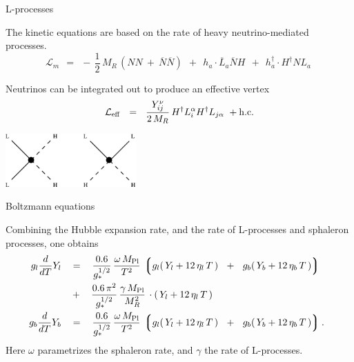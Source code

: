 \documentclass[pdf,UofT06talk,slideColor,colorBG,accumulate]{prosper}
\newcommand{\ov}{\overline}
\newcommand{\lgr}{\left\lgroup}
\newcommand{\rgr}{\right\rgroup}
\newcommand{\Mpl}{M_{\rm Pl}}
\begin{document}
\begin{slide}{L-processes}

	The kinetic equations are based on the rate of heavy
	neutrino-mediated processes.
\[
	\mathcal{L}_m  ~~=~~ 
	-\,\frac 12\, M_R\, \left( NN ~+~ \ov{N}\ov{N} \right) ~~+~~
				h_a\cdot \ov{L}_a\ov{ N}H ~~+~~  
				h_a^\dagger\cdot H^\dagger N L_a~
\]	

	Neutrinos can be integrated out to produce an effective
	vertex
\[
	\mathcal{L}_{\rm eff} ~~=~~ \frac{Y_{ij}^\nu}{2\, M_R} \, H^\dag L_i^\alpha H^\dag L_{j\alpha}~
+{\rm h.c.}
\]

\begin{center}
\includegraphics[width=5cm]{lflip.eps}
\end{center}


\end{slide}

\begin{slide}{Boltzmann equations}

	Combining the Hubble expansion rate, and the rate of 
	L-processes and sphaleron processes, one obtains
\[
\begin{split}
	g_l \frac{d}{dT}Y_l 
	& ~~\;=~~\;
	\frac{0.6}{g_*^{1/2}}\, 
	\frac{\omega\,\Mpl}{T^2}\,
	\lgr g_l (\,Y_l + 12\,\eta_l\,T\,) ~~+~~ 
	     g_b (\,Y_b + 12\,\eta_b\,T\,)  \rgr 
	\;~~%
	\\
	& \;~~+~~\;  
	\frac{0.6\,\pi^2}{g_*^{1/2}}\, 
	\frac{\gamma\,\Mpl}{M_R^2}\,
	\cdot (\, Y_l + 12\,\eta_l\,T\,)\\
	g_b \frac{d}{dT}Y_b 
	& ~~\;=~~\;
	\frac{0.6}{g_*^{1/2}}\, 
	\frac{\omega\,\Mpl}{T^2}\,
	\lgr g_l (\,Y_l + 12\,\eta_l\,T\,) ~~+~~ 
	     g_b (\,Y_b + 12\,\eta_b\,T\,)  \rgr .
\end{split}
\]
	Here  $ \omega $ parametrizes the sphaleron rate, and
	$ \gamma $ the rate of L-processes.

\end{slide}
\end{document}

